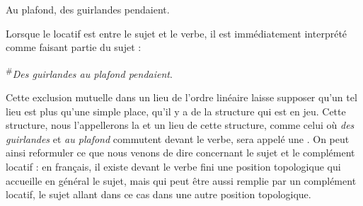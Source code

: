 \ea
{Au plafond, des guirlandes pendaient}.
\z

Lorsque le locatif est entre le sujet et le verbe, il est immédiatement interprété comme faisant partie du sujet :

\ea
\textsuperscript{\#}\textit{Des guirlandes au plafond pendaient}.
\z

Cette exclusion mutuelle dans un lieu de l’ordre linéaire laisse supposer qu’un tel lieu est plus qu’une simple place, qu’il y a de la structure qui est en jeu. Cette structure, nous l’appellerons la  et un lieu de cette structure, comme celui où \textit{des guirlandes} et \textit{au plafond} commutent devant le verbe, sera appelé une . On peut ainsi reformuler ce que nous venons de dire concernant le sujet et le complément locatif : en français, il existe devant le verbe fini une position topologique qui accueille en général le sujet, mais qui peut être aussi remplie par un complément locatif, le sujet allant dans ce cas dans une autre position topologique.

